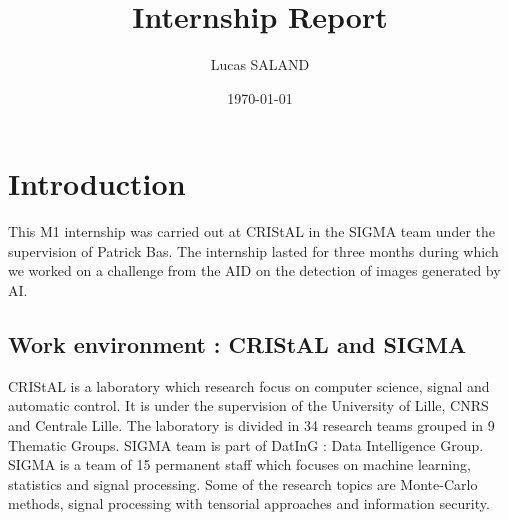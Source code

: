 \documentclass[12pt,a4paper]{article}
\title{Internship Report}
\author{Lucas SALAND}
\date{\today}
\begin{document}
\maketitle
\newpage
\tableofcontents
\newpage

\section*{Introduction}
This M1 internship was carried out at CRIStAL in the SIGMA team under the supervision of Patrick Bas. The internship lasted for three months during which we worked on a challenge from the AID on the detection of images generated by AI.

\subsection*{Work environment : CRIStAL and SIGMA}
CRIStAL is a laboratory which research focus on computer science, signal and automatic control. It is under the supervision of the University of Lille, CNRS and Centrale Lille. The laboratory is divided in 34 research teams grouped in 9 Thematic Groups. SIGMA team is part of DatInG : Data Intelligence Group. SIGMA is a team of 15 permanent staff which focuses on machine learning, statistics and signal processing. Some of the research topics are Monte-Carlo methods, signal processing with tensorial approaches and information security.
\end{document}
